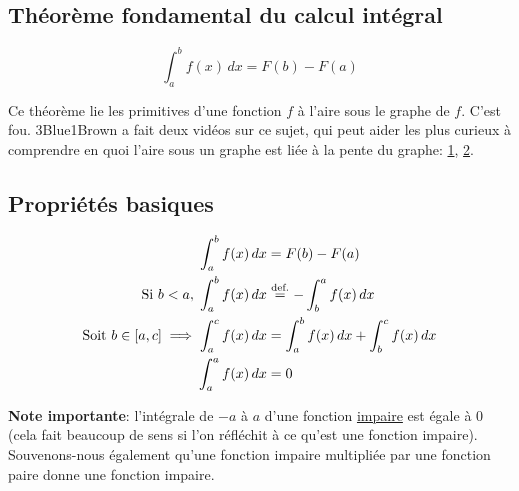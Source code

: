 \documentclass{article}
\newcommand\eqdef{\; \stackrel{ \mathclap{ \normalfont\text{def.} } }{ = } \;} %
\begin{document}
\subsection{Théorème fondamental du calcul intégral}
\begin{equation}
	\boxed{ \int_a^b f(x) \, dx = F(b) - F(a) }
\end{equation}

Ce théorème lie les primitives d'une fonction \(f\) à l'aire sous le graphe de \(f\). C'est fou. 3Blue1Brown a fait deux vidéos sur ce sujet, qui peut aider les plus curieux à comprendre en quoi l'aire sous un graphe est liée à la pente du graphe: \href{https://www.youtube.com/watch?v=rfG8ce4nNh0}{1}, \href{https://www.youtube.com/watch?v=FnJqaIESC2s}{2}.

\subsection{Propriétés basiques}
\begin{align*}
	\int_a^b f(x) \, dx &= F(b) - F(a) \\
	\text{Si } b < a, \; \int_a^b f(x) \, dx &\eqdef -\int_b^a f(x) \, dx \\
	\text{Soit } b \in \left[a, c\right] \implies \int_a^c f(x) \, dx &= \int_a^b f(x) \, dx + \int_b^c f(x) \, dx \\
	\int_a^a f(x) \, dx &= 0
\end{align*}

\textbf{Note importante}: l'intégrale de \(-a\) à \(a\) d'une fonction \underline{impaire} est égale à 0 (cela fait beaucoup de sens si l'on réfléchit à ce qu'est une fonction impaire).
Souvenons-nous également qu'une fonction impaire multipliée par une fonction paire donne une fonction impaire.
\end{document}
